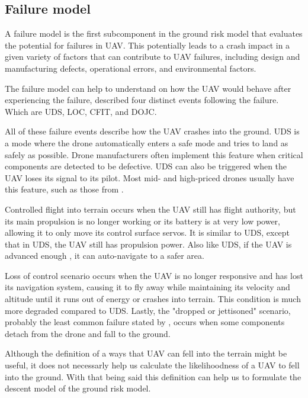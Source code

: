 \documentclass[12pt]{report}
\begin{document}
        \subsection{Failure model}
            A failure model is the first subcomponent in the ground risk model that evaluates the potential for failures
            in UAV. This potentially leads to a crash impact in a given variety of factors that can contribute to UAV
            failures, including design and manufacturing defects, operational errors, and environmental factors.

                The failure model can help to understand on how the UAV would behave after experiencing the failure,
            \cite{washington_review_2017} described four distinct events following the failure. Which are \ac{UDS}, 
            \ac{LOC}, \ac{CFIT}, and \ac{DOJC}.

            All of these failure events describe how the UAV crashes into the ground. UDS is a mode where the drone
            automatically enters a safe mode and tries to land as safely as possible. Drone manufacturers often
            implement this feature when critical components are detected to be defective. UDS can also be triggered when
            the UAV loses its signal to its pilot. Most mid- and high-priced drones usually have this feature, such as
            those from \cite{dji_consumer_2024}.
                
            Controlled flight into terrain occurs when the UAV still has flight authority, but its main propulsion is no
            longer working or its battery is at very low power, allowing it to only move its control surface servos. It
            is similar to UDS, except that in UDS, the UAV still has propulsion power. Also like UDS, if the UAV is
            advanced enough \cite{nemire_dji_2015}, it can auto-navigate to a safer area.
                
            Loss of control scenario occurs when the UAV is no longer responsive and has lost its navigation system,
            causing it to fly away while maintaining its velocity and altitude until it runs out of energy or crashes
            into terrain. This condition is much more degraded compared to UDS. Lastly, the "dropped or jettisoned"
            scenario, probably the least common failure stated by \cite{washington_review_2017}, occurs when some
            components detach from the drone and fall to the ground.

            Although the definition of a ways that UAV can fell into the terrain might be useful, it does not necessarly
            help us calculate the likelihoodness of a UAV to fell into the ground. With that being said this definition
            can help us to formulate the descent model of the ground risk model.
            
\end{document}
